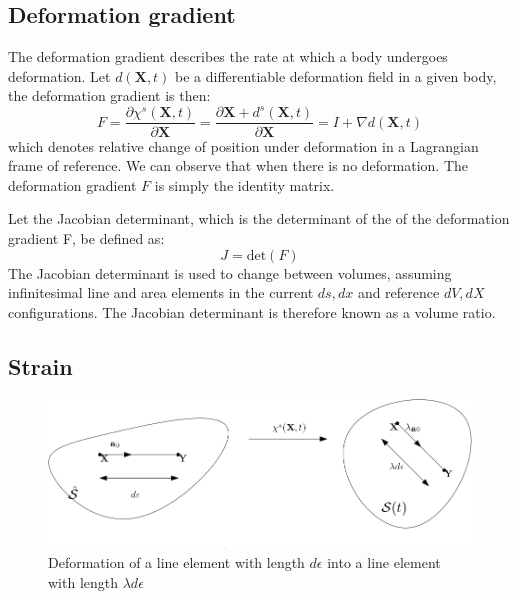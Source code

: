 \subsection{Deformation gradient}
The deformation gradient describes the rate at which a body undergoes deformation.
Let $d(\textbf{X},t)$ be a differentiable deformation field in a given body, the deformation gradient is then:  
\begin{equation}
\label{eq:deformation_gradient}
F = \frac{\partial \chi^s(\textbf{X},t)}{\partial \textbf{X}} = \frac{\partial \textbf{X}  + d^s(\textbf{X} ,t) }{\partial \textbf{X}} =  I + \nabla d(\textbf{X},t) 
\end{equation}
which denotes relative change of position under deformation in a Lagrangian frame of reference. We can observe that when there is no deformation. The deformation gradient $F$ is simply the identity matrix. \newline

Let the Jacobian determinant, which is the determinant of the of the deformation gradient F, be defined as:
\begin{equation}\label{eq:J}
J = \text{det}(F)
\end{equation}
The Jacobian determinant is used to change between volumes, assuming infinitesimal line and area elements in the current $ds, dx$ and reference $dV,dX$ configurations. The Jacobian determinant is therefore known as a volume ratio.

\subsection{Strain}
\begin{figure}[H]
\includegraphics[scale=0.40]{./Solid_equations/Strain.png}
\caption{Deformation of a line element with length $d\epsilon$ into a line element with length $\lambda d \epsilon$}
\end{figure}

